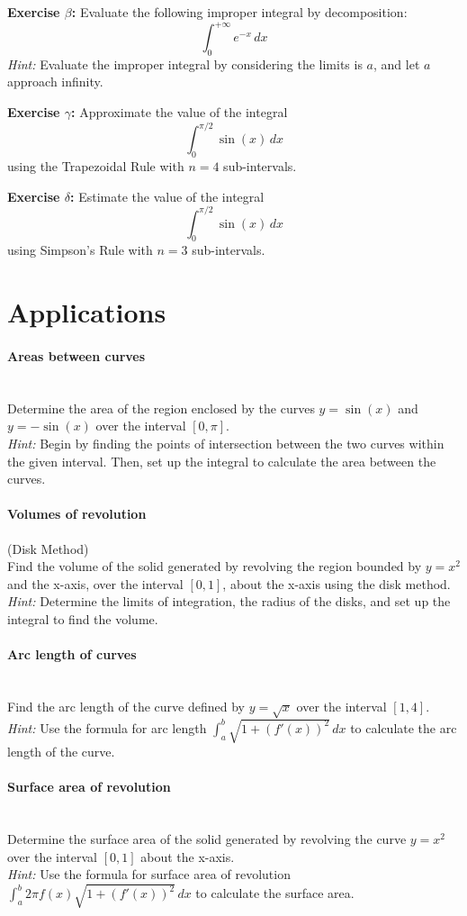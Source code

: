 \documentclass[]{article}
\begin{document}
	\textbf{Exercise $\beta$:}
	Evaluate the following improper integral by decomposition:
	\[
	\int_0^{+\infty} e^{-x}\, dx
	\]
	\textit{Hint:} Evaluate the improper integral by considering the limits is $a$, and let $a$ approach infinity.
	
	\textbf{Exercise $\gamma$:}
	Approximate the value of the integral
	\[
	\int_0^{\pi/2} \sin(x) \, dx
	\]
	using the Trapezoidal Rule with \(n = 4\) sub-intervals.
	
	\textbf{Exercise $\delta$:}
	Estimate the value of the integral
	\[
	\int_0^{\pi/2} \sin(x) \, dx
	\]
	using Simpson's Rule with \(n = 3\) sub-intervals.
	
	
	\section{Applications}
	\paragraph{Areas between curves}\mbox{}\\
	Determine the area of the region enclosed by the curves \(y = \sin(x)\) and \(y = -\sin(x)\) over the interval \([0, \pi]\).\\
	\textit{Hint:} Begin by finding the points of intersection between the two curves within the given interval.
	Then, set up the integral to calculate the area between the curves.
	
	\paragraph{Volumes of revolution} (Disk Method)\\
	Find the volume of the solid generated by revolving the region bounded by \(y = x^2\) and the x-axis, over the interval \([0, 1]\), about the x-axis using the disk method.\\
	\textit{Hint:} Determine the limits of integration, the radius of the disks, and set up the integral to find the volume.
	
	\paragraph{Arc length of curves}\mbox{}\\
	Find the arc length of the curve defined by \(y = \sqrt{x}\) over the interval \([1, 4]\).\\
	\textit{Hint:} Use the formula for arc length \(\int_a^b \sqrt{1 + (f'(x))^2} \, dx\) to calculate the arc length of the curve.
	
	\paragraph{Surface area of revolution}\mbox{}\\
	Determine the surface area of the solid generated by revolving the curve \(y = x^2\) over the interval \([0, 1]\) about the x-axis.\\
	\textit{Hint:} Use the formula for surface area of revolution \(\int_a^b 2\pi f(x) \sqrt{1 + (f'(x))^2} \, dx\) to calculate the surface area.
	
	
\end{document}
